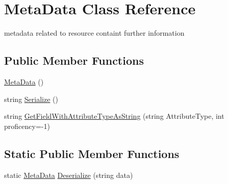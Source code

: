 \hypertarget{class_meta_data}{}\section{Meta\+Data Class Reference}
\label{class_meta_data}


metadata related to resource containt further information  


\subsection*{Public Member Functions}
\begin{DoxyCompactItemize}
\item 
\mbox{\hyperlink{class_meta_data_a51477d7066b8b3e42d41236f62ef5f36}{Meta\+Data}} ()
\item 
string \mbox{\hyperlink{class_meta_data_ad61836ec0caf65061ecdcd16c0ee6109}{Serialize}} ()
\item 
string \mbox{\hyperlink{class_meta_data_a6060e6297723e54b0df6c20defb57297}{Get\+Field\+With\+Attribute\+Type\+As\+String}} (string Attribute\+Type, int proficency=-\/1)
\end{DoxyCompactItemize}
\subsection*{Static Public Member Functions}
\begin{DoxyCompactItemize}
\item 
static \mbox{\hyperlink{class_meta_data}{Meta\+Data}} \mbox{\hyperlink{class_meta_data_adcfb4cc074566933e35c3f14451960ed}{Deserialize}} (string data)
\end{DoxyCompactItemize}
